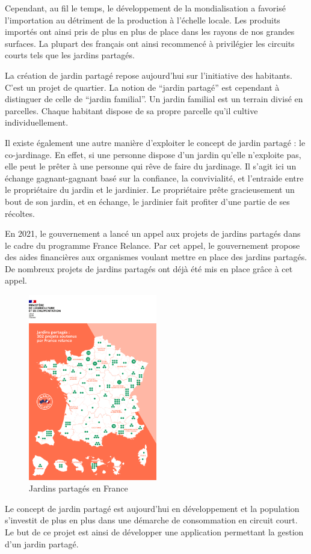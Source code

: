 \documentclass[french,a4paper]{article}
\begin{document}
Cependant, au fil le temps, le développement de la mondialisation a favorisé l’importation au détriment de la production à l’échelle locale. Les produits importés ont ainsi pris de plus en plus de place dans les rayons de nos grandes surfaces. La plupart des français ont ainsi recommencé à privilégier les circuits courts tels que les jardins partagés.

La création de jardin partagé repose aujourd’hui sur l’initiative des habitants. C’est un projet de quartier. La notion de “jardin partagé” est cependant à distinguer de celle de “jardin familial”.  Un jardin familial est un terrain divisé en parcelles. Chaque habitant dispose de sa propre parcelle qu’il cultive individuellement.

Il existe également une autre manière d’exploiter le concept de jardin partagé : le co-jardinage. En effet, si une personne dispose d’un jardin qu’elle n’exploite pas, elle peut le prêter à une personne qui rêve de faire du jardinage. Il s’agit ici un échange gagnant-gagnant basé sur la confiance, la convivialité, et l'entraide entre le propriétaire du jardin et le jardinier. Le propriétaire prête gracieusement un bout de son jardin, et en échange, le jardinier fait profiter d'une partie de ses récoltes.

En 2021, le gouvernement a lancé un appel aux projets de jardins partagés dans le cadre du programme France Relance. Par cet appel, le gouvernement propose des aides financières aux organismes voulant mettre en place des jardins partagés. De nombreux projets de jardins partagés ont déjà été mis en place grâce à cet appel.
\begin{figure}[H]
    \centering
    \includegraphics[width=0.5\textwidth]{img/francerelance_carte.png}
    \caption{Jardins partagés en France}
\end{figure}
Le concept de jardin partagé est aujourd’hui en développement et la population s’investit de plus en plus dans une démarche de consommation en circuit court. Le but de ce projet est ainsi de développer une application permettant la gestion d’un jardin partagé.
\end{document}
